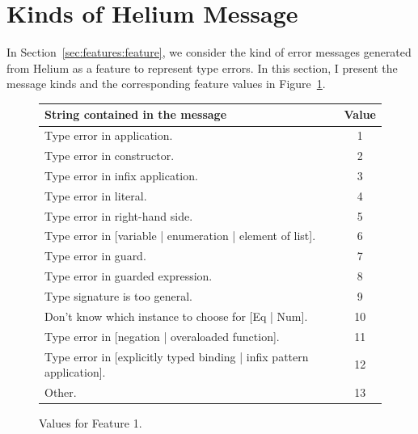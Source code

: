 \documentclass[12pt]{report}	%
\begin{document}
%	

%	
%
%
%
\appendix

\section{Kinds of Helium Message}
\label{sec:msgkind}

In Section~\ref{sec:features:feature},
we consider the kind of error messages generated from Helium as a feature to represent type errors.
In this section, I present the message kinds and the corresponding feature values in Figure~\ref{fig:heliummsg}.

\begin{figure}
\centering
\begin{tabular}{l | c }
\toprule
String contained in the message & Value \\
\midrule
Type error in application. & 1\\
Type error in constructor. & 2\\
Type error in infix application. & 3 \\
Type error in literal.  & 4\\
Type error in right-hand side. & 5 \\
Type error in [variable | enumeration | element of list]. & 6 \\
Type error in guard. & 7 \\
Type error in guarded expression. & 8 \\
Type signature is too general. & 9 \\
Don't know which instance to choose for [Eq | Num]. & 10 \\
Type error in [negation | overaloaded function]. & 11 \\
Type error in [explicitly typed binding | infix pattern application]. & 12 \\
Other. & 13 \\
\bottomrule
\end{tabular}
\caption{Values for Feature 1.}
\label{fig:heliummsg}
\end{figure}

%
%
%
\end{document}
